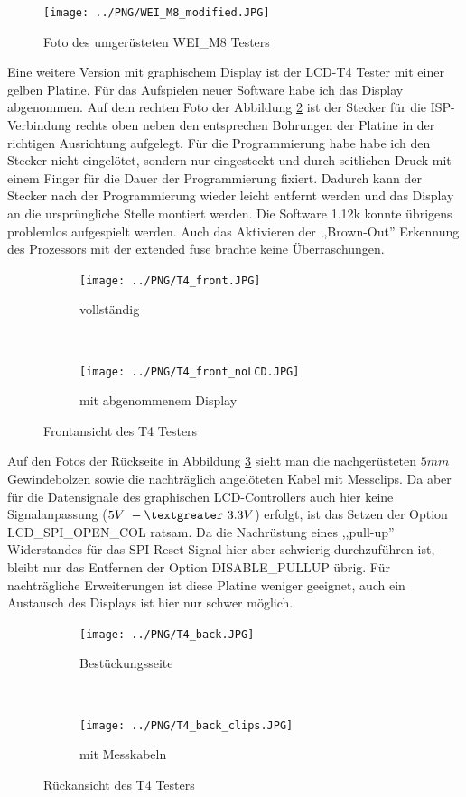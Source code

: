 \begin{figure}[H]
\centering
\texttt{[image: ../PNG/WEI\_M8\_modified.JPG]}	%
\caption{Foto des umgerüsteten WEI\_M8 Testers}
\label{fig:WeiM8mod}
\end{figure}

Eine weitere Version mit graphischem Display ist der LCD-T4 Tester mit einer gelben Platine.
Für das Aufspielen neuer Software habe ich das Display abgenommen.
Auf dem rechten Foto der Abbildung \ref{fig:T4_front} ist der Stecker für die ISP-Verbindung rechts oben
 neben den entsprechen Bohrungen der Platine in der richtigen Ausrichtung aufgelegt.
Für die Programmierung habe habe ich den Stecker nicht eingelötet, sondern nur eingesteckt und durch
seitlichen Druck mit einem Finger für die Dauer der Programmierung fixiert.
Dadurch kann der Stecker nach der Programmierung wieder leicht entfernt werden und das Display
an die ursprüngliche Stelle montiert werden.
Die Software 1.12k konnte übrigens problemlos aufgespielt werden.
Auch das Aktivieren der ,,Brown-Out'' Erkennung des Prozessors mit der extended fuse
brachte keine Überraschungen.

\begin{figure}[H]
  \begin{subfigure}[b]{.5\textwidth}	%
    \centering
    \texttt{[image: ../PNG/T4\_front.JPG]}	%
    \caption{vollständig}
  \end{subfigure}
  ~
  \begin{subfigure}[b]{.5\textwidth}	%
    \centering
    \texttt{[image: ../PNG/T4\_front\_noLCD.JPG]}	%
    \caption{mit abgenommenem Display}
  \end{subfigure}
  \caption{Frontansicht des T4 Testers}
  \label{fig:T4_front}
\end{figure}

Auf den Fotos der Rückseite in Abbildung \ref{fig:T4_back} sieht man die nachgerüsteten
\(5mm\) Gewindebolzen sowie die nachträglich angelöteten Kabel mit Messclips.
Da aber für die Datensignale des graphischen LCD-Controllers auch hier
keine Signalanpassung (\(5V~-\textgreater ~3.3V\)) erfolgt, ist das Setzen der Option LCD\_SPI\_OPEN\_COL ratsam.
Da die Nachrüstung eines ,,pull-up'' Widerstandes für das SPI-Reset Signal hier
aber schwierig durchzuführen ist, bleibt nur das Entfernen der Option
DISABLE\_PULLUP übrig. 
Für nachträgliche Erweiterungen ist diese Platine weniger geeignet, auch ein Austausch des
Displays ist hier nur schwer möglich.

\begin{figure}[H]
  \begin{subfigure}[b]{.5\textwidth}	%
    \centering
    \texttt{[image: ../PNG/T4\_back.JPG]}	%
    \caption{Bestückungsseite}
  \end{subfigure}
  ~
  \begin{subfigure}[b]{.5\textwidth}	%
    \centering
    \texttt{[image: ../PNG/T4\_back\_clips.JPG]}	%
    \caption{mit Messkabeln}
  \end{subfigure}
  \caption{Rückansicht des T4 Testers}
  \label{fig:T4_back}
\end{figure}

